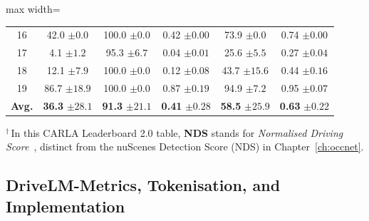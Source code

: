 \begin{table}[!tp]
\begin{adjustbox}{max width=\textwidth}
\begin{tabular}{c|c|c|c|c|c}
    16 & 42.0 {\color{gray}\footnotesize $\pm 0.0$} & 100.0 {\color{gray}\footnotesize $\pm 0.0$} & 0.42 {\color{gray}\footnotesize $\pm 0.00$} & 73.9 {\color{gray}\footnotesize $\pm 0.0$} & 0.74 {\color{gray}\footnotesize $\pm 0.00$} \\
    17 & 4.1 {\color{gray}\footnotesize $\pm 1.2$} & 95.3 {\color{gray}\footnotesize $\pm 6.7$} & 0.04 {\color{gray}\footnotesize $\pm 0.01$} & 25.6 {\color{gray}\footnotesize $\pm 5.5$} & 0.27 {\color{gray}\footnotesize $\pm 0.04$} \\
    18 & 12.1 {\color{gray}\footnotesize $\pm 7.9$} & 100.0 {\color{gray}\footnotesize $\pm 0.0$} & 0.12 {\color{gray}\footnotesize $\pm 0.08$} & 43.7 {\color{gray}\footnotesize $\pm 15.6$} & 0.44 {\color{gray}\footnotesize $\pm 0.16$} \\
    19 & 86.7 {\color{gray}\footnotesize $\pm 18.9$} & 100.0 {\color{gray}\footnotesize $\pm 0.0$} & 0.87 {\color{gray}\footnotesize $\pm 0.19$} & 94.9 {\color{gray}\footnotesize $\pm 7.2$} & 0.95 {\color{gray}\footnotesize $\pm 0.07$} \\
    \midrule
    \textbf{Avg.} & \textbf{36.3} {\color{gray}\footnotesize $\pm 28.1$} & \textbf{91.3} {\color{gray}\footnotesize $\pm 21.1$} & \textbf{0.41} {\color{gray}\footnotesize $\pm 0.28$} & \textbf{58.5} {\color{gray}\footnotesize $\pm 25.9$} & \textbf{0.63} {\color{gray}\footnotesize $\pm 0.22$} \\
    \bottomrule
  \end{tabular}
  \end{adjustbox}
  \par\smallskip
  {\linespread{1.1}\footnotesize\raggedright
  $^{\dagger}$\,In this CARLA Leaderboard 2.0 table, \textbf{NDS} stands for \emph{Normalised Driving Score}~\cite{beisswenger2024pdmlite}, distinct from the nuScenes Detection Score (NDS) in Chapter~\ref{ch:occnet}.\par}
\end{table}

\subsection{DriveLM-Metrics, Tokenisation, and Implementation}\label{drivelm:app:metrics_behavior}\label{drivelm:app:agent_context}\label{drivelm:app:agent_tokenisation}\label{drivelm:app:waymo_ablation}\label{drivelm:app:more_vlms}\label{drivelm:app:complexity}\label{drivelm:app:metrics}\label{drivelm:app:metrics_vqa}\label{drivelm:app:metrics_beh}\label{drivelm:app:metrics_motion}\label{drivelm:app:agent}\label{drivelm:app:impl}\label{drivelm:app:exp}\label{drivelm:app:vqa_metrics}

